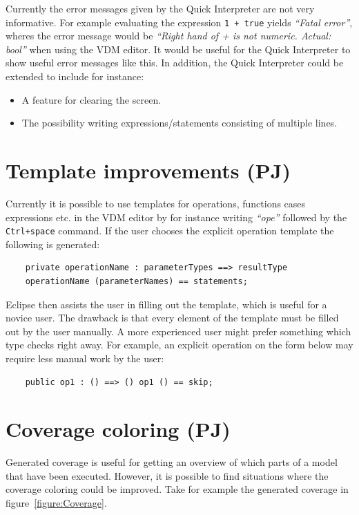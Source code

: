 \documentclass[11pt]{overturerep}
\begin{document}
Currently the error messages given by the Quick Interpreter are not very
informative. For example evaluating the expression \texttt{1 + true} yields
\textit{``Fatal error''}, wheres the error message would be \textit{``Right
hand of + is not numeric. Actual: bool''} when using the VDM editor. It would
be useful for the Quick Interpreter to show useful error messages like this. In
addition, the Quick Interpreter could be extended to include for instance:

\begin{itemize}
    \item A feature for clearing the screen.
    \item The possibility writing expressions/statements consisting of multiple
        lines.
\end{itemize}


\section{Template improvements (PJ)}

Currently it is possible to use templates for operations, functions cases
expressions etc. in the VDM editor by for instance writing \textit{``ope''}
followed by the \texttt{Ctrl+space} command. If the user chooses the explicit
operation template the following is generated:

\begin{lstlisting} 
    private operationName : parameterTypes ==> resultType
    operationName (parameterNames) == statements; 
\end{lstlisting}

Eclipse then assists the user in filling out the template, which is useful for
a novice user. The drawback is that every element of the template must be
filled out by the user manually. A more experienced user might prefer something
which type checks right away. For example, an explicit operation on the form
below may require less manual work by the user:

\begin{lstlisting} 
    public op1 : () ==> () op1 () == skip; 
\end{lstlisting}


\section{Coverage coloring (PJ)}

Generated coverage is useful for getting an overview of which parts of a model
that have been executed. However, it is possible to find situations where the
coverage coloring could be improved. Take for example the generated coverage in
figure~\ref{figure:Coverage}.
\end{document}
